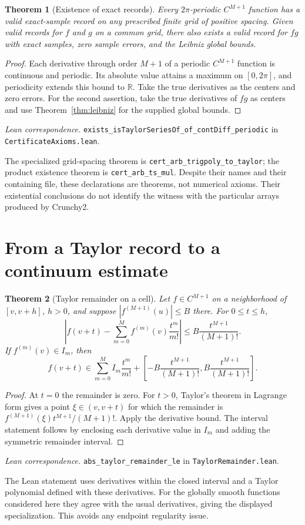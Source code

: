 \documentclass[11pt]{article}
\newtheorem{theorem}{Theorem}[section]
\theoremstyle{definition}
\theoremstyle{remark}
\newcommand{\R}{\mathbb R}
\newcommand{\code}[1]{\nolinkurl{#1}}
\newcommand{\leanref}[2]{\par\smallskip\noindent\textit{Lean correspondence.}
  \code{#1} in \code{#2}.\par\smallskip}
\numberwithin{equation}{section}
\begin{document}
\begin{theorem}[Existence of exact records]
\label{thm:existence}
Every $2\pi$-periodic $C^{M+1}$ function has a valid exact-sample record
on any prescribed finite grid of positive spacing. Given valid records
for $f$ and $g$ on a common grid, there also exists a valid record for $fg$ with exact
samples, zero sample errors, and the Leibniz global bounds.
\end{theorem}
\begin{proof}
Each derivative through order $M+1$ of a periodic $C^{M+1}$ function is
continuous and periodic. Its absolute value attains a maximum on
$[0,2\pi]$, and periodicity extends this bound to $\R$. Take the true
derivatives as the centers and zero errors. For the second assertion,
take the true derivatives of $fg$ as centers and use
Theorem~\ref{thm:leibniz} for the supplied global bounds.
\end{proof}
\leanref{exists_isTaylorSeriesOf_of_contDiff_periodic}{CertificateAxioms.lean}
The specialized grid-spacing theorem is \code{cert_arb_trigpoly_to_taylor};
the product existence theorem is \code{cert_arb_ts_mul}. Despite their
names and their containing file, these declarations are theorems, not
numerical axioms. Their existential conclusions do not identify the witness
with the particular arrays produced by Crunchy2.

\section{From a Taylor record to a continuum estimate}
\label{sec:continuum}

\begin{theorem}[Taylor remainder on a cell]
\label{thm:cell}
Let $f\in C^{M+1}$ on a neighborhood of $[v,v+h]$, $h>0$, and suppose
$|f^{(M+1)}(u)|\leq B$ there. For $0\leq t\leq h$,
\begin{equation}
 \left|f(v+t)-\sum_{m=0}^{M}f^{(m)}(v)\frac{t^m}{m!}\right|
 \leq B\frac{t^{M+1}}{(M+1)!}.
 \label{eq:taylor-remainder}
\end{equation}
If $f^{(m)}(v)\in I_m$, then
\begin{equation}
 f(v+t)\in\sum_{m=0}^{M}I_m\frac{t^m}{m!}
 +\left[-B\frac{t^{M+1}}{(M+1)!},B\frac{t^{M+1}}{(M+1)!}\right].
\end{equation}
\end{theorem}
\begin{proof}
At $t=0$ the remainder is zero. For $t>0$, Taylor's theorem in Lagrange
form gives a point $\xi\in(v,v+t)$ for which the remainder is
$f^{(M+1)}(\xi)t^{M+1}/(M+1)!$. Apply the derivative bound. The interval
statement follows by enclosing each derivative value in $I_m$ and adding
the symmetric remainder interval.
\end{proof}
\leanref{abs_taylor_remainder_le}{TaylorRemainder.lean}
The Lean statement uses derivatives within the closed interval and a
Taylor polynomial defined with these derivatives. For the globally smooth
functions considered here they agree with the usual derivatives, giving
the displayed specialization. This avoids any endpoint regularity issue.
\end{document}
